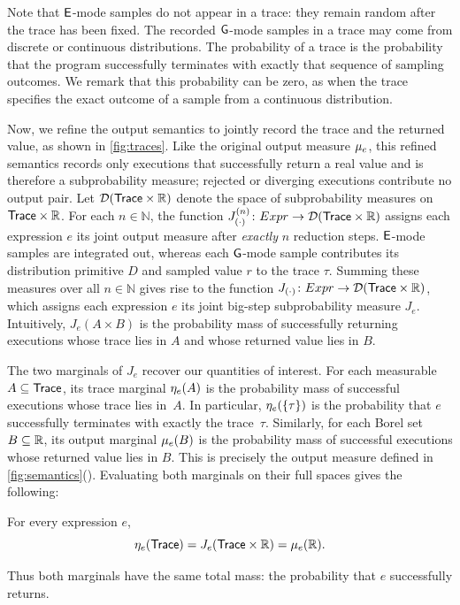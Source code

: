 Note that $\mathsf{E}$-mode samples do not appear in a trace: they remain
random after the trace has been fixed. The recorded $\mathsf{G}$-mode samples
in a trace may come from discrete or continuous distributions. The
probability of a trace is the probability that the program successfully
terminates with exactly that sequence of sampling outcomes. We remark that this
probability can be zero, as when the trace specifies the exact outcome
of a sample from a continuous distribution.

Now, we refine the output semantics to jointly record the trace and the
returned value, as shown in \cref{fig:traces}. Like the original output
measure $\mu_{e}$, this refined semantics records only executions that
successfully return a real value and is therefore a subprobability
measure; rejected or diverging executions contribute no output pair.
Let $\mathcal D(\mathsf{Trace}\times\mathbb R)$ denote the space of
subprobability measures on $\mathsf{Trace}\times\mathbb R$.
For each $n\in\mathbb N$, the function
$J_{(\cdot)}^{(n)}\colon Expr\to\mathcal D(\mathsf{Trace}\times\mathbb R)$
assigns each expression $e$ its joint output measure after \emph{exactly}
$n$ reduction steps. $\mathsf{E}$-mode samples are integrated out, whereas
each $\mathsf{G}$-mode sample contributes its distribution primitive $D$ and
sampled value $r$ to the trace $\tau$. Summing these measures over
all $n \in \mathbb{N}$ gives rise to the function
$J_{(\cdot)}\colon Expr\to\mathcal D(\mathsf{Trace}\times\mathbb R)$,
which assigns each expression $e$ its joint big-step subprobability
measure $J_e$.
Intuitively, $J_e(A\times B)$ is the probability mass of successfully
returning executions whose trace lies in $A$ and whose returned value
lies in $B$.

The two marginals of $J_e$ recover our quantities of interest. For
each measurable $A\subseteq\mathsf{Trace}$, its trace marginal
$\eta_{e}(A)$ is the probability mass of successful
executions whose trace lies in~$A$. In particular,
$\eta_{e}(\{\tau\})$ is the probability that $e$ successfully terminates
with exactly the trace~$\tau$. Similarly, for each Borel set
$B\subseteq\mathbb{R}$, its output marginal
$\mu_{e}(B)$ is the probability mass of
successful executions whose returned value lies in $B$. This is
precisely the output measure defined in
\cref{fig:semantics}(). Evaluating both
marginals on their full spaces gives the following:

\begin{theorem}
For every expression $e$,
\[
  \eta_{e}(\mathsf{Trace})
  =J_e(\mathsf{Trace}\times\mathbb{R})
  =\mu_{e}(\mathbb{R}).
\]
\end{theorem}
Thus both marginals have the same total mass: the probability that $e$
successfully returns.


